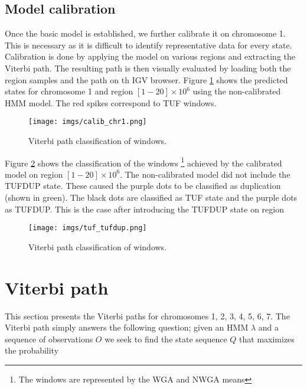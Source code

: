    

\subsection{Model calibration}
\label{model_calibration}

Once the basic model is  established, we further calibrate it on chromosome 1. 
This is necessary as it is difficult to identify representative data for every state. Calibration is done by applying 
the model on various regions and extracting the Viterbi path. The resulting path is then visually evaluated by loading both the region samples and the path on th IGV browser.  Figure \ref{calib_chr1} shows the predicted states for chromosome 1 and region $[1-20]\times 10^6$ using the non-calibrated HMM model. The red spikes correspond to TUF windows.  

\begin{figure}[!htb]
	\begin{center}
		\texttt{[image: imgs/calib\_chr1.png]}
	\end{center}
	\caption{Viterbi path classification of windows.}
	\label{calib_chr1}
\end{figure}

Figure \ref{tuf_tufdup} shows the classification of the windows \footnote{The windows are represented by the WGA and NWGA means} achieved by the calibrated model on region $[1-20]\times 10^6$. The non-calibrated model did not include the TUFDUP state. These caused the purple dots to be classified as duplication (shown in green). The black dots are classified as TUF state and the purple dots as TUFDUP. This is the case after introducing the TUFDUP state
on region 
	
	
\begin{figure}[!htb]
	\begin{center}
		\texttt{[image: imgs/tuf\_tufdup.png]}
	\end{center}
	\caption{Viterbi path classification of windows.}
	\label{tuf_tufdup}
\end{figure} 

\section{Viterbi path}
\label{viterbi_path}

This section presents the Viterbi paths for chromosomes 1, 2, 3, 4, 5, 6, 7. 
The Viterbi path simply answers the following 
question; given an HMM $\lambda$ and a sequence of observations $O$ we seek to find the state sequence  $Q$ that maximizes the probability

